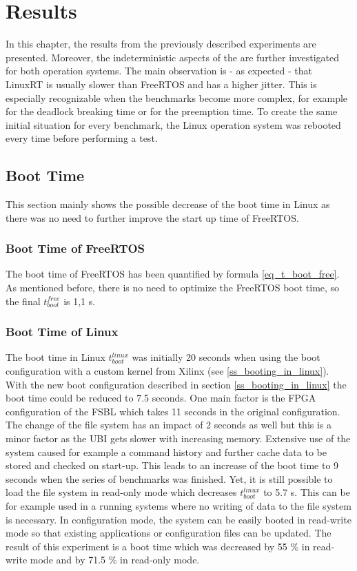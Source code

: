 \chapter{Results}\label{ch_results}
In this chapter, the results from the previously described experiments are presented.
Moreover, the indeterministic aspects of the are further investigated for both operation systems. 
The main observation is - as expected - that LinuxRT is usually slower than FreeRTOS and has a higher jitter. 
This is especially recognizable when the benchmarks become more complex, for example for the deadlock breaking time or for the preemption time.
To create the same initial situation for every benchmark, the Linux operation system was rebooted every time before performing a test.

\section{Boot Time}
This section mainly shows the possible decrease of the boot time in Linux as there was no need to further improve the start up time of FreeRTOS.

\subsection{Boot Time of FreeRTOS}
The boot time of FreeRTOS has been quantified by formula \ref{eq_t_boot_free}.
As mentioned before, there is no need to optimize the FreeRTOS boot time, so the final $ t_{boot}^{free} $ is 1,1 s.

\subsection{Boot Time of Linux}
The boot time in Linux $ t_{boot}^{linux} $ was initially 20 seconds when using the boot configuration with a custom kernel from Xilinx (see \ref{ss_booting_in_linux}). 
With the new boot configuration described in section \ref{ss_booting_in_linux} the boot time could be reduced to 7.5 seconds. 
One main factor is the \ac{FPGA} configuration of the \ac{FSBL} which takes 11 seconds in the original configuration.
The change of the file system has an impact of 2 seconds as well but this is a minor factor as the \ac{UBI} gets slower with increasing memory. 
Extensive use of the system caused for example a command history and further cache data to be stored and checked on start-up.
This leads to an increase of the boot time to 9 seconds when the series of benchmarks was finished.
Yet, it is still possible to load the file system in read-only mode which decreases $ t_{boot}^{linux} $ to 5.7 s.
This can be for example used in a running systems where no writing of data to the file system is necessary.
In configuration mode, the system can be easily booted in read-write mode so that existing applications or configuration files can be updated. 
The result of this experiment is a boot time which was decreased by 55 \% in read-write mode and by 71.5 \% in read-only mode.

